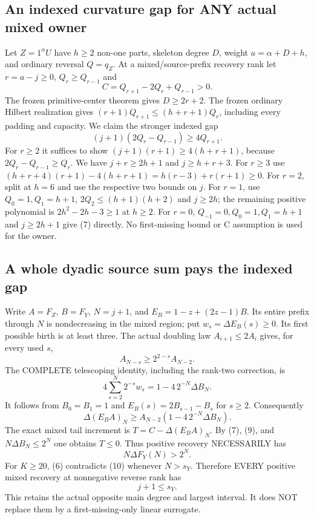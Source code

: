 \documentclass[11pt]{article}
\begin{document}
\subsection{An indexed curvature gap for ANY actual mixed owner}
Let $Z=1^\alpha U$ have $h\ge2$ non-one parts, skeleton degree $D$,
weight $a=\alpha+D+h$, and ordinary reversal $Q=q_Z$.
At a mixed/source-prefix recovery rank let $r=a-j\ge0$,
$Q_r\ge Q_{r-1}$ and
\[
                           C=Q_{r+1}-2Q_r+Q_{r-1}>0.
\]
The frozen primitive-center theorem gives $D\ge2r+2$.
The frozen ordinary Hilbert realization gives
$(r+1)Q_{r+1}\le(h+r+1)Q_r$, including every padding and capacity.
We claim the stronger indexed gap
\[
                    (j+1)(2Q_r-Q_{r-1})\ge4Q_{r+1}.  \tag{7}
\]
For $r\ge2$ it suffices to show
$(j+1)(r+1)\ge4(h+r+1)$, because $2Q_r-Q_{r-1}\ge Q_r$.
We have $j+r\ge2h+1$ and $j\ge h+r+3$.
For $r\ge3$ use
$(h+r+4)(r+1)-4(h+r+1)=h(r-3)+r(r+1)\ge0$.
For $r=2$, split at $h=6$ and use the respective two bounds on $j$.
For $r=1$, use $Q_0=1,Q_1=h+1$,
$2Q_2\le(h+1)(h+2)$ and $j\ge2h$; the remaining positive polynomial
is $2h^2-2h-3\ge1$ at $h\ge2$.
For $r=0$, $Q_{-1}=0,Q_0=1,Q_1=h+1$ and $j\ge2h+1$ give (7)
directly. No first-missing bound or C assumption is used for the owner.

\subsection{A whole dyadic source sum pays the indexed gap}
Write $A=F_Z$, $B=F_Y$, $N=j+1$, and
$E_B=1-z+(2z-1)B$. Its entire prefix through $N$ is nondecreasing
in the mixed region; put $w_s=\Delta E_B(s)\ge0$.
Its first possible birth is at least three. The actual doubling law
$A_{i+1}\le2A_i$ gives, for every used $s$,
\[
                       A_{N-s}\ge2^{2-s}A_{N-2}.
\]
The COMPLETE telescoping identity, including the rank-two correction, is
\[
 4\sum_{s=2}^N2^{-s}w_s
                   =1-4\,2^{-N}\Delta B_N.           \tag{8}
\]
It follows from $B_0=B_1=1$ and $E_B(s)=2B_{s-1}-B_s$ for $s\ge2$.
Consequently
\[
 \Delta(E_BA)_N\ge A_{N-2}(1-4\,2^{-N}\Delta B_N).    \tag{9}
\]
The exact mixed tail increment is $T=C-\Delta(E_BA)_N$.
By (7), (9), and $N\Delta B_N\le2^N$ one obtains $T\le0$.
Thus positive recovery NECESSARILY has
\[
                           N\Delta F_Y(N)>2^N.         \tag{10}
\]
For $K\ge20$, (6) contradicts (10) whenever $N>s_Y$.
Therefore EVERY positive mixed recovery at nonnegative reverse rank has
\[
                              j+1\le s_Y.             \tag{11}
\]
This retains the actual opposite main degree and largest interval.
It does NOT replace them by a first-missing-only linear surrogate.
\end{document}
